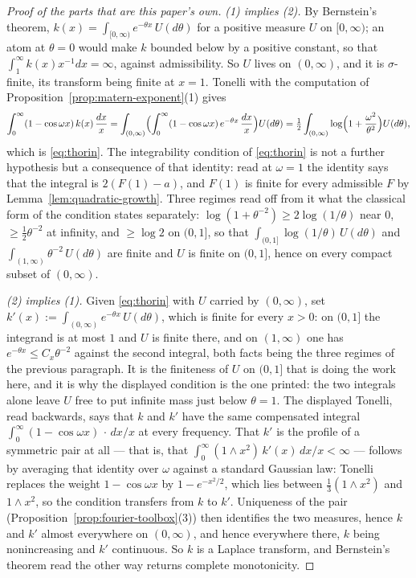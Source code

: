 \begin{proof}[Proof of the parts that are this paper's own]
\emph{(1) implies (2).} By Bernstein's theorem, $k(x) = \int_{[0,\infty)} e^{-\theta x}\,U(d\theta)$
for a positive measure $U$ on $[0,\infty)$; an atom at $\theta = 0$ would make $k$ bounded below
by a positive constant, so that $\int_1^\infty k(x)x^{-1}dx = \infty$, against admissibility. So
$U$ lives on $(0,\infty)$, and it is $\sigma$-finite, its transform being finite at $x = 1$.
Tonelli with the computation of Proposition~\ref{prop:matern-exponent}(1) gives
\[
  \int_0^\infty (1-\cos\omega x)\,k(x)\,\frac{dx}{x}
  = \int_{(0,\infty)}\Bigl(\int_0^\infty (1-\cos\omega x)\,e^{-\theta x}\,\frac{dx}{x}\Bigr) U(d\theta)
  = \tfrac12\int_{(0,\infty)}\log\Bigl(1 + \frac{\omega^2}{\theta^2}\Bigr)U(d\theta),
\]
which is \ref{eq:thorin}. The integrability condition of \ref{eq:thorin} is not a further
hypothesis but a consequence of that identity: read at $\omega = 1$ the identity says that the
integral is $2(F(1) - a)$, and $F(1)$ is finite for every admissible $F$ by
Lemma~\ref{lem:quadratic-growth}. Three regimes read off from it what the classical form of the
condition states separately: $\log(1+\theta^{-2}) \ge 2\log(1/\theta)$ near $0$,
$\ge \tfrac12\theta^{-2}$ at infinity, and $\ge \log 2$ on $(0,1]$, so that
$\int_{(0,1]}\log(1/\theta)\,U(d\theta)$ and $\int_{(1,\infty)}\theta^{-2}\,U(d\theta)$ are finite
and $U$ is finite on $(0,1]$, hence on every compact subset of $(0,\infty)$.

\emph{(2) implies (1).} Given \ref{eq:thorin} with $U$ carried by $(0,\infty)$, set
$k'(x) := \int_{(0,\infty)} e^{-\theta x}\,U(d\theta)$, which is finite for every $x > 0$: on
$(0,1]$ the integrand is at most $1$ and $U$ is finite there, and on $(1,\infty)$ one has
$e^{-\theta x} \le C_x\theta^{-2}$ against the second integral, both facts being the three regimes
of the previous paragraph. It is the finiteness of $U$ on $(0,1]$ that is doing the work here, and
it is why the displayed condition is the one printed: the two integrals alone leave $U$ free to
put infinite mass just below $\theta = 1$. The displayed Tonelli, read backwards, says that $k$ and $k'$ have the same
compensated integral $\int_0^\infty(1-\cos\omega x)\,\cdot\,dx/x$ at every frequency. That $k'$
is the profile of a symmetric \Levy{} pair at all --- that is, that
$\int_0^\infty (1\wedge x^2)\,k'(x)\,dx/x < \infty$ --- follows by averaging that identity over
$\omega$ against a standard Gaussian law: Tonelli replaces the weight $1 - \cos\omega x$ by
$1 - e^{-x^2/2}$, which lies between $\tfrac13(1 \wedge x^2)$ and $1 \wedge x^2$, so the \Levy{}
condition transfers from $k$ to $k'$. Uniqueness of the pair
(Proposition~\ref{prop:fourier-toolbox}(3)) then identifies the two \Levy{} measures, hence $k$
and $k'$ almost everywhere on $(0,\infty)$, and hence everywhere there, $k$ being nonincreasing
and $k'$ continuous. So $k$ is a Laplace transform, and Bernstein's theorem read the other way
returns complete monotonicity.


\end{proof}
